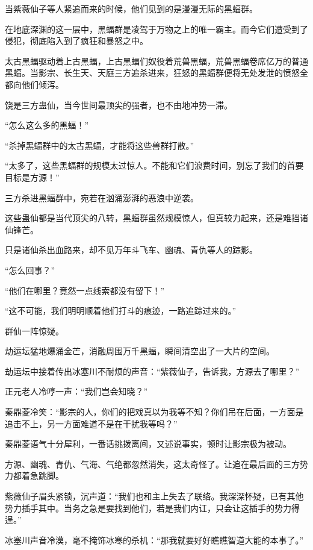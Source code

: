 
\begin{this_body}

当紫薇仙子等人紧追而来的时候，他们见到的是漫漫无际的黑蝠群。

在地底深渊的这一层中，黑蝠群是凌驾于万物之上的唯一霸主。而今它们遭受到了侵犯，彻底陷入到了疯狂和暴怒之中。

太古黑蝠驱动着上古黑蝠，上古黑蝠们奴役着荒兽黑蝠，荒兽黑蝠卷席亿万的普通黑蝠。当影宗、长生天、天庭三方追杀进来，狂怒的黑蝠群便将无处发泄的愤怒全都向他们倾泻。

饶是三方蛊仙，当今世间最顶尖的强者，也不由地冲势一滞。

“怎么这么多的黑蝠！”

“杀掉黑蝠群中的太古黑蝠，才能将这些兽群打散。”

“太多了，这些黑蝠群的规模太过惊人。不能和它们浪费时间，别忘了我们的首要目标是方源！”

三方杀进黑蝠群中，宛若在汹涌澎湃的恶浪中逆袭。

这些蛊仙都是当代顶尖的八转，黑蝠群虽然规模惊人，但真较力起来，还是难挡诸仙锋芒。

只是诸仙杀出血路来，却不见万年斗飞车、幽魂、青仇等人的踪影。

“怎么回事？”

“他们在哪里？竟然一点线索都没有留下！”

“这不可能，我们明明顺着他们打斗的痕迹，一路追踪过来的。”

群仙一阵惊疑。

劫运坛猛地爆涌金芒，消融周围万千黑蝠，瞬间清空出了一大片的空间。

劫运坛中接着传出冰塞川不耐烦的声音：“紫薇仙子，告诉我，方源去了哪里？”

正元老人冷哼一声：“我们岂会知晓？”

秦鼎菱冷笑：“影宗的人，你们的把戏真以为我等不知？你们吊在后面，一方面是追击不上，另一方面难道不是在干扰我等吗？”

秦鼎菱语气十分犀利，一番话挑拨离间，又述说事实，顿时让影宗极为被动。

方源、幽魂、青仇、气海、气绝都忽然消失，这太奇怪了。让追在最后面的三方势力都着急跳脚。

紫薇仙子眉头紧锁，沉声道：“我们也和主上失去了联络。我深深怀疑，已有其他势力插手其中。当务之急是要找到他们，若是我们内讧，只会让这插手的势力得逞。”

冰塞川声音冷漠，毫不掩饰冰寒的杀机：“那我就要好好瞧瞧智道大能的本事了。”


\end{this_body}
